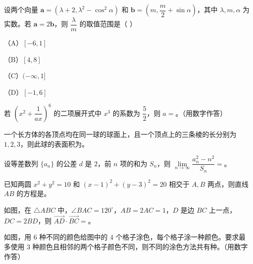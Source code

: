 \begin{question}
设两个向量 $\boldsymbol{a}=(\lambda+2,\lambda^2-\cos^2\alpha)$ 和 $\boldsymbol{b}=\left(m,\dfrac{m}{2}+\sin\alpha\right)$，其中 $\lambda,m,\alpha$ 为实数。若 $\boldsymbol{a}=2\boldsymbol{b}$，则 $\dfrac{\lambda}{m}$ 的取值范围是（ ）

（A）$[-6,1]$

（B）$[4,8]$

（C）$(-\infty,1]$

（D）$[-1,6]$

\end{question}

\begin{question}
若 $\left(x^2+\dfrac{1}{ax}\right)^6$ 的二项展开式中 $x^3$ 的系数为 $\dfrac{5}{2}$，则 $a=$\gkblank{}。（用数字作答）

\end{question}
\begin{question}
一个长方体的各顶点均在同一球的球面上，且一个顶点上的三条棱的长分别为 $1,2,3$，则此球的表面积为\gkblank{}。

\end{question}
\begin{question}
设等差数列 $\{a_n\}$ 的公差 $d$ 是 $2$，前 $n$ 项的和为 $S_n$，则 $\lim\limits_{n\to\infty}\dfrac{a_n^2-n^2}{S_n}=$\gkblank{}。

\end{question}
\begin{question}
已知两圆 $x^2+y^2=10$ 和 $(x-1)^2+(y-3)^2=20$ 相交于 $A,B$ 两点，则直线 $AB$ 的方程是\gkblank{}。

\Needspace{0.4\textheight}
\end{question}
\begin{question}
如图，在 $\triangle ABC$ 中，$\angle BAC=120^\circ$，$AB=2AC=1$，$D$ 是边 $BC$ 上一点，$DC=2BD$，则 $\overrightarrow{AD}\cdot\overrightarrow{BC}=$\gkblank{}。
\nopagebreak[4]
\begin{center}\end{center}
\nopagebreak[4]
\Needspace{0.4\textheight}
\end{question}
\begin{question}
如图，用 $6$ 种不同的颜色给图中的 $4$ 个格子涂色，每个格子涂一种颜色。要求最多使用 $3$ 种颜色且相邻的两个格子颜色不同，则不同的涂色方法共有\gkblank{}种。（用数字作答）
\nopagebreak[4]
\begin{center}\end{center}
\nopagebreak[4]
\end{question}

